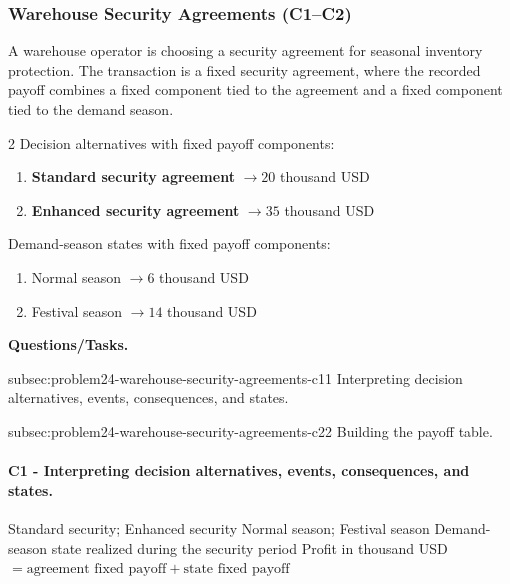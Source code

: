 	\subsubsection{Warehouse Security Agreements (C1--C2)}
	\label{sec:problem24-warehouse-security-agreements-c1-c2}
	A warehouse operator is choosing a security agreement for seasonal inventory protection. The transaction is a fixed security agreement, where the recorded payoff combines a fixed component tied to the agreement and a fixed component tied to the demand season.

	\begin{multicols}{2}
		Decision alternatives with fixed payoff components:
		\begin{enumerate}[label=\arabic*.]
			\item \textbf{Standard security agreement} $\to 20$ thousand USD
			\item \textbf{Enhanced security agreement} $\to 35$ thousand USD
		\end{enumerate}

			\columnbreak

		Demand-season states with fixed payoff components:
		\begin{enumerate}[label=\arabic*.]
			\item Normal season $\to 6$ thousand USD
			\item Festival season $\to 14$ thousand USD
		\end{enumerate}
	\end{multicols}

	\textbf{Questions/Tasks.}
	\begin{enumerate}
		\CriterionTask
		{subsec:problem24-warehouse-security-agreements-c1}{1}
		{Interpreting decision alternatives, events, consequences, and states.}

		\CriterionTask
		{subsec:problem24-warehouse-security-agreements-c2}{2}
		{Building the payoff table.}
	\end{enumerate}

	\paragraph*{C1 - Interpreting decision alternatives, events, consequences, and states.}
	\label{subsec:problem24-warehouse-security-agreements-c1}
	\DecisionElementsTable
	{Standard security; Enhanced security}
	{Normal season; Festival season}
	{Demand-season state realized during the security period}
	{Profit in thousand USD $= \text{agreement fixed payoff} + \text{state fixed payoff}$}

